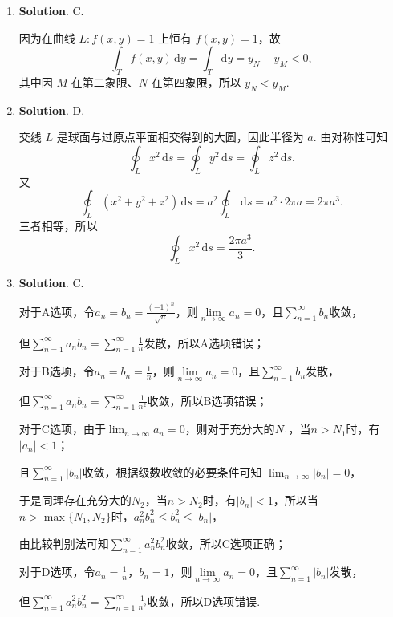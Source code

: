 \documentclass[../main.tex]{subfiles}
\begin{document}
\begin{enumerate}
    \item \textbf{Solution}. C.

          因为在曲线 \(L:f(x,y)=1\) 上恒有 \(f(x,y)=1\)，故
          \[
              \int_T f(x,y)\,\mathrm{d}y=\int_T \mathrm{d}y=y_N-y_M<0,
          \]
          其中因 \(M\) 在第二象限、\(N\) 在第四象限，所以 \(y_N<y_M\).

    \item \textbf{Solution}. D.

          交线 \(L\) 是球面与过原点平面相交得到的大圆，因此半径为 \(a\). 由对称性可知
          \[
              \oint_L x^2\,\mathrm{d}s=\oint_L y^2\,\mathrm{d}s=\oint_L z^2\,\mathrm{d}s.
          \]
          又
          \[
              \oint_L(x^2+y^2+z^2)\,\mathrm{d}s=a^2\oint_L\,\mathrm{d}s=a^2\cdot 2\pi a=2\pi a^3.
          \]
          三者相等，所以
          \[
              \oint_L x^2\,\mathrm{d}s=\frac{2\pi a^3}{3}.
          \]

    \item \textbf{Solution}. C.

          对于A选项，令$a_n=b_n=\frac{(-1)^n}{\sqrt{n}}$，则$\lim\limits_{n\to\infty}a_n=0$，且$\sum_{n=1}^{\infty}b_n$收敛，

          但$\sum_{n=1}^{\infty}a_n b_n=\sum_{n=1}^{\infty}\frac{1}{n}$发散，所以A选项错误；

          对于B选项，令$a_n=b_n=\frac{1}{n}$，则$\lim\limits_{n\to\infty}a_n=0$，且$\sum_{n=1}^{\infty}b_n$发散，

          但$\sum_{n=1}^{\infty}a_n b_n=\sum_{n=1}^{\infty}\frac{1}{n^2}$收敛，所以B选项错误；

          对于C选项，由于$\lim_{n\to\infty}a_n=0$，则对于充分大的$N_1$，当$n>N_1$时，有$|a_n|<1$；

          且$\sum_{n=1}^\infty |b_n|$收敛，根据级数收敛的必要条件可知 $\lim_{n\to\infty} |b_n| = 0$，

          于是同理存在充分大的$N_2$，当$n>N_2$时，有$|b_n|<1$，所以当$n>\max\{N_1,N_2\}$时，$a_n^2 b_n^2 \leq b_n^2\leq |b_n|$，

          由比较判别法可知$\sum_{n=1}^\infty a_n^2 b_n^2$收敛，所以C选项正确；

          对于D选项，令$a_n=\frac{1}{n}$，$b_n=1$，则$\lim\limits_{n\to\infty}a_n=0$，且$\sum_{n=1}^{\infty} |b_n|$发散，

          但$\sum_{n=1}^{\infty} a_n^2 b_n^2=\sum_{n=1}^{\infty} \frac{1}{n^2}$收敛，所以D选项错误.
\end{enumerate}
\end{document}
